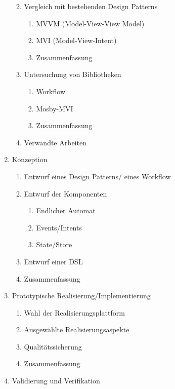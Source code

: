 \begin{enumerate}
\begin{enumerate}
\begin{enumerate}
        \end{enumerate}
        \item Vergleich mit bestehenden Design Patterns
        \begin{enumerate}
            \item MVVM (Model-View-View Model)
            \item MVI (Model-View-Intent)
            \item Zusammenfassung
        \end{enumerate}
        \item Untersuchung von Bibliotheken
        \begin{enumerate}
            \item Workflow
            \item Mosby-MVI
            \item Zusammenfassung
        \end{enumerate}
        \item Verwandte Arbeiten
    \end{enumerate}
    \item Konzeption
    \begin{enumerate}
        \item Entwurf eines Design Patterns/ eines Workflow
        \item Entwurf der Komponenten
        \begin{enumerate}
            \item Endlicher Automat
            \item Events/Intents
            \item State/Store
        \end{enumerate}
        \item Entwurf einer DSL
        \item Zusammenfassung
    \end{enumerate}
    \item Prototypische Realisierung/Implementierung
        \begin{enumerate}
            \item Wahl der Realisierungsplattform
            \item Ausgewählte Realisierungsaspekte
            \item Qualitätssicherung
            \item Zusammenfassung
        \end{enumerate}
    \item Validierung und Verifikation
    \begin{enumerate}

\end{enumerate}
\end{enumerate}
